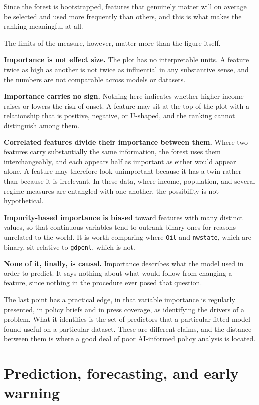 \documentclass[
  a4paper,
]{scrbook}
\begin{document}
Since the forest is bootstrapped, features that genuinely matter will on
average be selected and used more frequently than others, and this is
what makes the ranking meaningful at all.

The limits of the measure, however, matter more than the figure itself.

\textbf{Importance is not effect size.} The plot has no interpretable
units. A feature twice as high as another is not twice as influential in
any substantive sense, and the numbers are not comparable across models
or datasets.

\textbf{Importance carries no sign.} Nothing here indicates whether
higher income raises or lowers the risk of onset. A feature may sit at
the top of the plot with a relationship that is positive, negative, or
U-shaped, and the ranking cannot distinguish among them.

\textbf{Correlated features divide their importance between them.} Where
two features carry substantially the same information, the forest uses
them interchangeably, and each appears half as important as either would
appear alone. A feature may therefore look unimportant because it has a
twin rather than because it is irrelevant. In these data, where income,
population, and several regime measures are entangled with one another,
the possibility is not hypothetical.

\textbf{Impurity-based importance is biased} toward features with many
distinct values, so that continuous variables tend to outrank binary
ones for reasons unrelated to the world. It is worth comparing where
\texttt{Oil} and \texttt{nwstate}, which are binary, sit relative to
\texttt{gdpenl}, which is not.

\textbf{None of it, finally, is causal.} Importance describes what the
model used in order to predict. It says nothing about what would follow
from changing a feature, since nothing in the procedure ever posed that
question.

The last point has a practical edge, in that variable importance is
regularly presented, in policy briefs and in press coverage, as
identifying the drivers of a problem. What it identifies is the set of
predictors that a particular fitted model found useful on a particular
dataset. These are different claims, and the distance between them is
where a good deal of poor AI-informed policy analysis is located.

\section{Prediction, forecasting, and early
warning}\label{prediction-forecasting-and-early-warning}
\end{document}
